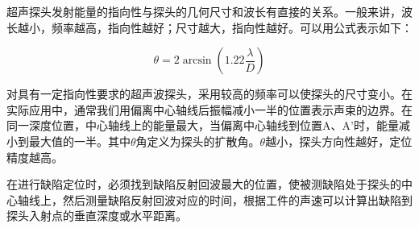 ﻿\documentclass[12pt,a4paper]{article}
\begin{document}
超声探头发射能量的指向性与探头的几何尺寸和波长有直接的关系。一般来讲，波长越小，频率越高，指向性越好；尺寸越大，指向性越好。可以用公式表示如下：

$$\theta = 2\arcsin\left(1.22\frac{\lambda}{D}\right)$$

对具有一定指向性要求的超声波探头，采用较高的频率可以使探头的尺寸变小。在实际应用中，通常我们用偏离中心轴线后振幅减小一半的位置表示声束的边界。在同一深度位置，中心轴线上的能量最大，当偏离中心轴线到位置A、A'时，能量减小到最大值的一半。其中$\theta$角定义为探头的扩散角。$\theta$越小，探头方向性越好，定位精度越高。

在进行缺陷定位时，必须找到缺陷反射回波最大的位置，使被测缺陷处于探头的中心轴线上，然后测量缺陷反射回波对应的时间，根据工件的声速可以计算出缺陷到探头入射点的垂直深度或水平距离。
\end{document}
